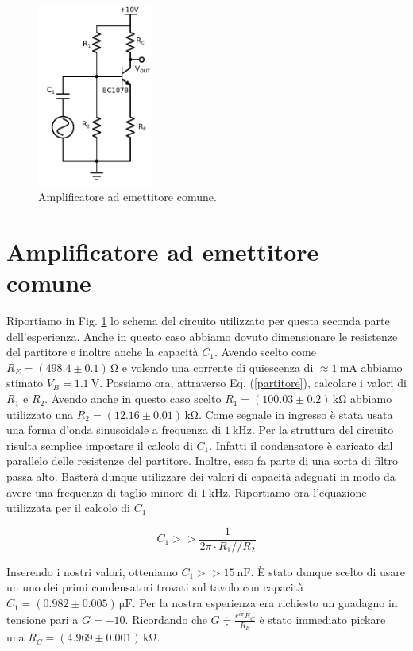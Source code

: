 
\begin{figure}
	\includegraphics[width=38mm]{cc2.pdf}
	\caption{Amplificatore ad emettitore comune.}
	\label{fig:cc2}
\end{figure}

\section{Amplificatore ad emettitore comune}

Riportiamo in Fig. \ref{fig:cc2} lo schema del circuito utilizzato per questa seconda parte dell'esperienza.
Anche in questo caso abbiamo dovuto dimensionare le resistenze del partitore e inoltre anche la capacità $C_1$.
Avendo scelto come $R_E=(498.4\pm0.1)\,\si{\ohm}$ e volendo una corrente di quiescenza di $\approx \SI{1}{\milli\ampere}$ abbiamo stimato $V_B=\SI{1.1}{\volt}$.
Possiamo ora, attraverso Eq. (\ref{partitore}), calcolare i valori di $R_1$ e $R_2$.
Avendo anche in questo caso scelto $R_1=(100.03\pm0.2)\,\si{\kilo\ohm}$ abbiamo utilizzato una $R_2=(12.16\pm0.01)\,\si{\kilo\ohm}$.
Come segnale in ingresso è stata usata una forma d'onda sinusoidale a frequenza di $\SI{1}{\kilo\hertz}$.
Per la struttura del circuito risulta semplice impostare il calcolo di $C_1$.
Infatti il condensatore è caricato dal parallelo delle resistenze del partitore.
Inoltre, esso fa parte di una sorta di filtro passa alto.
Basterà dunque utilizzare dei valori di capacità adeguati in modo da avere una frequenza di taglio minore di $\SI{1}{\kilo\hertz}$.
Riportiamo ora l'equazione utilizzata per il calcolo di $C_1$

\begin{equation}
C_1>>\frac{1}{2 \pi \cdot R_1 // R_2}
\end{equation}

Inserendo i nostri valori, otteniamo $C_1>>\SI{15}{\nano\farad}$.
È stato dunque scelto di usare un uno dei primi condensatori trovati sul tavolo con capacità $C_1=(0.982\pm0.005)\,\si{\micro\farad}$.
Per la nostra esperienza era richiesto un guadagno in tensione pari a $G=-10$.
Ricordando che $G\doteqdot \frac{e^{i\pi}R_C}{R_E}$ è stato immediato pickare una $R_C=(4.969\pm0.001)\,\si{\kilo\ohm}$. 

